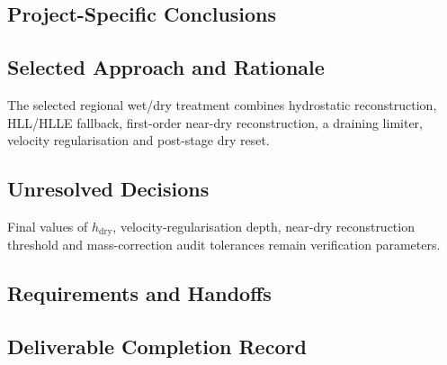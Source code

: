 
\subsection{Project-Specific Conclusions}
\label{sec:res-num-wet-conclusions}


\subsection{Selected Approach and Rationale}
\label{sec:res-num-wet-selected-approach}


The selected regional wet/dry treatment combines hydrostatic
reconstruction, HLL/HLLE fallback, first-order near-dry reconstruction,
a draining limiter, velocity regularisation and post-stage dry reset.

\subsection{Unresolved Decisions}
\label{sec:res-num-wet-unresolved-decisions}


Final values of $h_{\mathrm{dry}}$, velocity-regularisation depth,
near-dry reconstruction threshold and mass-correction audit tolerances
remain verification parameters.

\subsection{Requirements and Handoffs}
\label{sec:res-num-wet-requirements}


\subsection{Deliverable Completion Record}
\label{sec:res-num-wet-completion-record}

%
%
%
